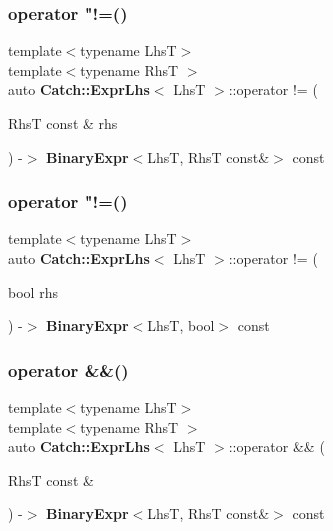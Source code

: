 \mbox{\label{class_catch_1_1_expr_lhs_af4c6b85fb0d089fcf55d961e1efed5ea}} 
\subsubsection{operator "!=()\hspace{0.1cm}{\footnotesize\ttfamily [1/2]}}
{\footnotesize\ttfamily template$<$typename LhsT$>$ \\
template$<$typename RhsT $>$ \\
auto \textbf{ Catch\+::\+Expr\+Lhs}$<$ LhsT $>$\+::operator != (\begin{DoxyParamCaption}\item[{RhsT const \&}]{rhs }\end{DoxyParamCaption}) -\/$>$ \textbf{ Binary\+Expr}$<$LhsT, RhsT const\&$>$ const \hspace{0.3cm}{\ttfamily [inline]}}

\mbox{\label{class_catch_1_1_expr_lhs_a75c4081701b1e57c32ffbdf124fe4297}} 
\subsubsection{operator "!=()\hspace{0.1cm}{\footnotesize\ttfamily [2/2]}}
{\footnotesize\ttfamily template$<$typename LhsT$>$ \\
auto \textbf{ Catch\+::\+Expr\+Lhs}$<$ LhsT $>$\+::operator != (\begin{DoxyParamCaption}\item[{bool}]{rhs }\end{DoxyParamCaption}) -\/$>$ \textbf{ Binary\+Expr}$<$LhsT, bool$>$ const \hspace{0.3cm}{\ttfamily [inline]}}

\mbox{\label{class_catch_1_1_expr_lhs_ab7d8d931db0dcff46fb1d23114c738c0}} 
\subsubsection{operator \&\&()}
{\footnotesize\ttfamily template$<$typename LhsT$>$ \\
template$<$typename RhsT $>$ \\
auto \textbf{ Catch\+::\+Expr\+Lhs}$<$ LhsT $>$\+::operator \&\& (\begin{DoxyParamCaption}\item[{RhsT const \&}]{ }\end{DoxyParamCaption}) -\/$>$ \textbf{ Binary\+Expr}$<$LhsT, RhsT const\&$>$ const \hspace{0.3cm}{\ttfamily [inline]}}

